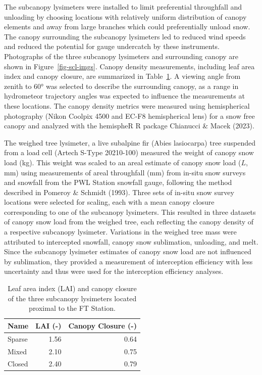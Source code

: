 \documentclass[
  letterpaper,
  DIV=11,
  numbers=noendperiod]{scrartcl}
\begin{document}
The subcanopy lysimeters were installed to limit preferential
throughfall and unloading by choosing locations with relatively uniform
distribution of canopy elements and away from large branches which could
preferentially unload snow. The canopy surrounding the subcanopy
lysimeters led to reduced wind speeds and reduced the potential for
gauge undercatch by these instruments. Photographs of the three
subcanopy lysimeters and surrounding canopy are shown in
Figure~\ref{fig-scl-imgs}. Canopy density measurements, including leaf
area index and canopy closure, are summarized in
Table~\ref{tbl-scl-lai-cc}. A viewing angle from zenith to 60° was
selected to describe the surrounding canopy, as a range in hydrometeor
trajectory angles was expected to influence the measurements at these
locations. The canopy density metrics were measured using hemispherical
photography (Nikon Coolpix 4500 and EC-F8 hemispherical lens) for a snow
free canopy and analyzed with the hemispheR R package Chianucci \& Macek
(2023).

The weighed tree lysimeter, a live subalpine fir (Abies lasiocarpa) tree
suspended from a load cell (Artech S-Type 20210-100) measured the weight
of canopy snow load (kg). This weight was scaled to an areal estimate of
canopy snow load (\(L\), mm) using measurements of areal throughfall
(mm) from in-situ snow surveys and snowfall from the PWL Station
snowfall gauge, following the method described in Pomeroy \& Schmidt
(1993). Three sets of in-situ snow survey locations were selected for
scaling, each with a mean canopy closure corresponding to one of the
subcanopy lysimeters. This resulted in three datasets of canopy snow
load from the weighed tree, each reflecting the canopy density of a
respective subcanopy lysimeter. Variations in the weighed tree mass were
attributed to intercepted snowfall, canopy snow sublimation, unloading,
and melt. Since the subcanopy lysimeter estimates of canopy snow load
are not influenced by sublimation, they provided a measurement of
interception efficiency with less uncertainty and thus were used for the
interception efficiency analyses.

\begin{longtable}[]{@{}lrr@{}}

\caption{\label{tbl-scl-lai-cc}Leaf area index (LAI) and canopy closure
of the three subcanopy lysimeters located proximal to the FT Station.}

\tabularnewline

\toprule\noalign{}
Name & LAI (-) & Canopy Closure (-) \\
\midrule\noalign{}
\endhead
\bottomrule\noalign{}
\endlastfoot
Sparse & 1.56 & 0.64 \\
Mixed & 2.10 & 0.75 \\
Closed & 2.40 & 0.79 \\

\end{longtable}
\end{document}

